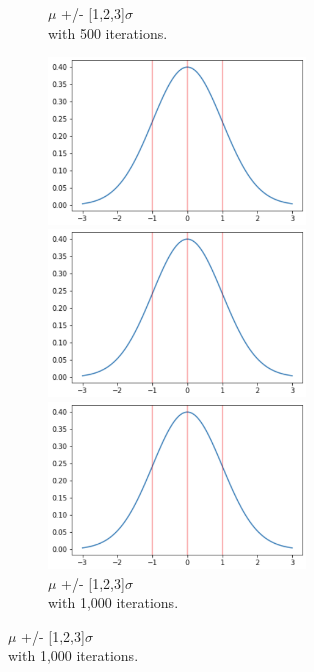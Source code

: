 \documentclass[12pt]{article}
\begin{document}
\begin{figure}[b]
\begin{subfigure}{.32\textwidth}
    \caption[short]{$\mu$ +/- [1,2,3]$\sigma$ \\with 500 iterations.}
\end{subfigure}
\begin{subfigure}{.32\textwidth}
    \centering
    \includegraphics[width=0.75\textwidth]{sd_3.png}
    \caption[short]{$\mu$ +/- [1]$\sigma$ \\with 1,000 iterations.}
    \includegraphics[width=0.75\textwidth]{sd_3.png}
    \caption[short]{$\mu$ +/- [1,2]$\sigma$ \\with 1,000 iterations.}
    \includegraphics[width=0.75\textwidth]{sd_3.png}
    \caption[short]{$\mu$ +/- [1,2,3]$\sigma$ \\with 1,000 iterations.}

\end{subfigure}
\end{figure}
\end{document}
